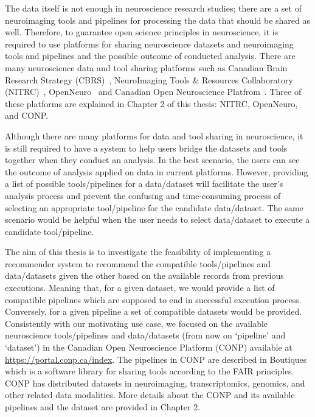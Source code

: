 
The data itself is not enough in neuroscience research studies; there are a set of neuroimaging tools and pipelines for processing the data that should be shared as well. Therefore, to guarantee open science principles in neuroscience, it is required to use platforms for sharing neuroscience datasets and neuroimaging tools and pipelines and the possible outcome of conducted analysis. There are many neuroscience data and tool sharing platforms such as Canadian Brain Research Strategy (CBRS)~\cite{CBRS}, NeuroImaging Tools \& Resources Collaboratory (NITRC)~\cite{nitrc}, OpenNeuro~\cite{markiewicz2021openneuro} and Canadian Open Neuroscience Platfrom~\cite{conp}. Three of these platforms are explained in Chapter 2 of this thesis: NITRC, OpenNeuro, and CONP.



Although there are many platforms for data and tool sharing in neuroscience, it is still required to have a system to help users bridge the datasets and tools together when they conduct an analysis. In the best scenario, the users can see the outcome of analysis applied on data in current platforms. However, providing a list of possible tools/pipelines for a data/dataset will facilitate the user's analysis process and prevent the confusing and time-consuming process of selecting an appropriate tool/pipeline for the candidate data/dataset. The same scenario would be helpful when the user needs to select data/dataset to execute a candidate tool/pipeline.

The aim of this thesis is to investigate the feasibility of implementing a recommender system to recommend the compatible tools/pipelines and data/datasets given the other based on the available records from previous executions. Meaning that, for a given dataset, we would provide a list of compatible pipelines which are supposed to end in successful execution process. Conversely, for a given pipeline a set of compatible datasets would be provided.%
Consistently with our motivating use case, we focused on the available neuroscience tools/pipelines and data/datasets (from now on `pipeline' and `dataset') in the Canadian Open Neuroscience Platform (CONP) available at \url{https://portal.conp.ca/index}. The pipelines in CONP are described in Boutiques~\cite{glatard2018boutiques} which is a software library for sharing tools according to the FAIR principles. CONP has distributed datasets in neuroimaging, transcriptomics, genomics, and other related data modalities. More details about the CONP and its available pipelines and the dataset are provided in Chapter 2.



